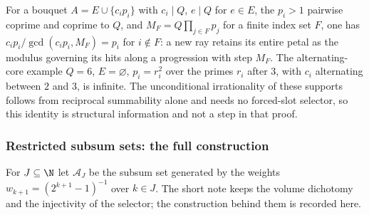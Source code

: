 \begin{obs}
For a bouquet $A=E\cup\{c_ip_i\}$ with $c_i\mid Q$, $e\mid Q$ for $e\in E$,
the $p_i>1$ pairwise coprime and coprime to $Q$, and $M_F=Q\prod_{j\in F}p_j$
for a finite index set $F$, one has $c_ip_i/\gcd(c_ip_i,M_F)=p_i$ for
$i\notin F$: a new ray retains its entire petal as the modulus governing its
hits along a progression with step $M_F$.  The alternating-core example
$Q=6$, $E=\varnothing$, $p_i=r_i^2$ over the primes $r_i$ after $3$, with
$c_i$ alternating between $2$ and $3$, is infinite.  The unconditional
irrationality of these supports follows from reciprocal summability alone and
needs no forced-slot selector, so this identity is structural information and
not a step in that proof.
\par\noindent{}  
\end{obs}

\subsubsection*{Restricted subsum sets: the full construction}

For $J\subseteq\N$ let $\mathcal A_J$ be the subsum set generated by the
weights $w_{k+1}=(2^{k+1}-1)^{-1}$ over $k\in J$.  The short note keeps the
volume dichotomy and the injectivity of the selector; the construction behind
them is recorded here.

